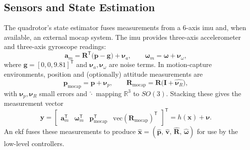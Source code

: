 \subsection{Sensors and State Estimation}
\label{sec:quadrotor_estimation}
The quadrotor's state estimator fuses measurements from a 6-axis \gls{imu} and, when available, an external \gls{mocap} system. The \gls{imu} provides three-axis accelerometer and three-axis gyroscope readings:
\begin{equation}
\mathbf{a}_m = \mathbf{R}^\mathsf{T}\bigl(\ddot{\mathbf{p}} - \mathbf{g}\bigr) + \boldsymbol{\nu}_a,\qquad
\boldsymbol{\omega}_m = \boldsymbol{\omega} + \boldsymbol{\nu}_\omega,
\end{equation}
where \(\mathbf{g}=[0,0,9.81]^\mathsf{T}\) and \(\boldsymbol{\nu}_a,\boldsymbol{\nu}_\omega\) are noise terms. In motion-capture environments, position and (optionally) attitude measurements are
\begin{equation}
\mathbf{p}_{\mathrm{mocap}} = \mathbf{p} + \boldsymbol{\nu}_p,\qquad
\mathbf{R}_{\mathrm{mocap}} = \mathbf{R}\bigl(\mathbf{I} + \widehat{\boldsymbol{\nu}_R}\bigr),
\end{equation}
with \(\boldsymbol{\nu}_p,\boldsymbol{\nu}_R\) small errors and \(\widehat{\cdot}\) mapping \(\mathbb{R}^3\) to \(SO(3)\). Stacking these gives the measurement vector
\begin{equation}
\mathbf{y} = \begin{bmatrix}
\mathbf{a}_m^\mathsf{T} & \boldsymbol{\omega}_m^\mathsf{T} & \mathbf{p}_{\mathrm{mocap}}^\mathsf{T} & \mathrm{vec}(\mathbf{R}_{\mathrm{mocap}})^\mathsf{T}
\end{bmatrix}^\mathsf{T} = h(\mathbf{x}) + \boldsymbol{\nu}.
\end{equation}
An \gls{ekf} fuses these measurements to produce \(\hat{\mathbf{x}} = (\hat{\mathbf{p}},\,\hat{\mathbf{v}},\,\hat{\mathbf{R}},\,\hat{\boldsymbol{\omega}})\) for use by the low-level controllers.
